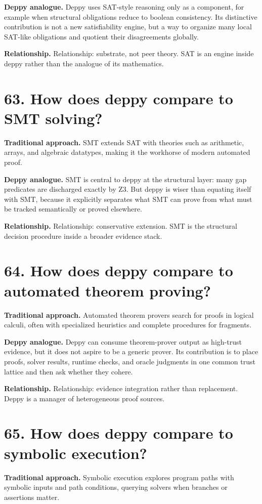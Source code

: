 \documentclass[11pt,openany]{book}
\begin{document}
\textbf{Deppy analogue.} Deppy uses SAT-style reasoning only as a component, for example when structural obligations reduce to boolean consistency. Its distinctive contribution is not a new satisfiability engine, but a way to organize many local SAT-like obligations and quotient their disagreements globally.

\textbf{Relationship.} Relationship: substrate, not peer theory. SAT is an engine inside deppy rather than the analogue of its mathematics.

\section*{63. How does deppy compare to SMT solving?}
\textbf{Traditional approach.} SMT extends SAT with theories such as arithmetic, arrays, and algebraic datatypes, making it the workhorse of modern automated proof.

\textbf{Deppy analogue.} SMT is central to deppy at the structural layer: many gap predicates are discharged exactly by Z3. But deppy is wiser than equating itself with SMT, because it explicitly separates what SMT can prove from what must be tracked semantically or proved elsewhere.

\textbf{Relationship.} Relationship: conservative extension. SMT is the structural decision procedure inside a broader evidence stack.

\section*{64. How does deppy compare to automated theorem proving?}
\textbf{Traditional approach.} Automated theorem provers search for proofs in logical calculi, often with specialized heuristics and complete procedures for fragments.

\textbf{Deppy analogue.} Deppy can consume theorem-prover output as high-trust evidence, but it does not aspire to be a generic prover. Its contribution is to place proofs, solver results, runtime checks, and oracle judgments in one common trust lattice and then ask whether they cohere.

\textbf{Relationship.} Relationship: evidence integration rather than replacement. Deppy is a manager of heterogeneous proof sources.

\section*{65. How does deppy compare to symbolic execution?}
\textbf{Traditional approach.} Symbolic execution explores program paths with symbolic inputs and path conditions, querying solvers when branches or assertions matter.
\end{document}
